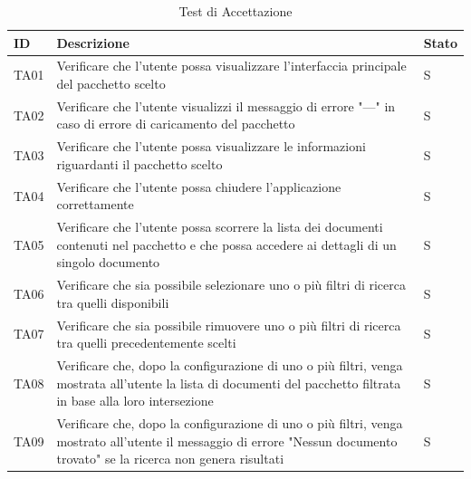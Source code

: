 \documentclass[a4paper,12pt]{article}
\begin{document}
            \begin{longtable}{|M{1.5cm}|M{8.5cm}|M{2cm}|}

                \caption{Test di Accettazione} \\
                \hline
                \textbf{ID} & \textbf{Descrizione} & \textbf{Stato} \\
                \hline
                \endhead

                TA01 & Verificare che l'utente possa visualizzare l'interfaccia principale del pacchetto scelto & S \\
                \hline

                TA02 & Verificare che l'utente visualizzi il messaggio di errore "---" in caso di errore di caricamento del pacchetto & S \\
                \hline

                TA03 & Verificare che l'utente possa visualizzare le informazioni riguardanti il pacchetto scelto & S \\
                \hline
                
                TA04 & Verificare che l'utente possa chiudere l'applicazione correttamente & S \\
                \hline

                TA05 & Verificare che l’utente possa scorrere la lista dei documenti contenuti nel pacchetto e che possa accedere ai dettagli di un singolo documento & S \\
                \hline
                
                TA06 & Verificare che sia possibile selezionare uno o più filtri di ricerca tra quelli disponibili & S \\
                \hline

                TA07 & Verificare che sia possibile rimuovere uno o più filtri di ricerca tra quelli precedentemente scelti & S \\
                \hline

                TA08 & Verificare che, dopo la configurazione di uno o più filtri, venga mostrata all'utente la lista di documenti del pacchetto filtrata in base alla loro intersezione & S \\
                \hline

                TA09 & Verificare che, dopo la configurazione di uno o più filtri, venga mostrato all'utente il messaggio di errore "Nessun documento trovato" se la ricerca non genera risultati & S \\
                \hline


\end{longtable}
\end{document}
